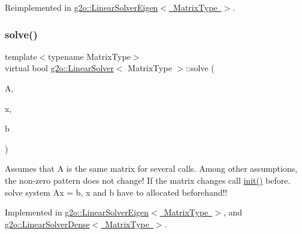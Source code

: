 Reimplemented in \mbox{\hyperlink{classg2o_1_1_linear_solver_eigen_a5ceaab3ba944d327b21f7329c7e19c8c}{g2o\+::\+Linear\+Solver\+Eigen$<$ Matrix\+Type $>$}}.

\mbox{\label{classg2o_1_1_linear_solver_aa44b40826d50203c8ce2ff258c34e030}} 
\subsubsection{\texorpdfstring{solve()}{solve()}}
{\footnotesize\ttfamily template$<$typename Matrix\+Type$>$ \\
virtual bool \mbox{\hyperlink{classg2o_1_1_linear_solver}{g2o\+::\+Linear\+Solver}}$<$ Matrix\+Type $>$\+::solve (\begin{DoxyParamCaption}\item[{const \mbox{\hyperlink{classg2o_1_1_sparse_block_matrix}{Sparse\+Block\+Matrix}}$<$ Matrix\+Type $>$ \&}]{A,  }\item[{double $\ast$}]{x,  }\item[{double $\ast$}]{b }\end{DoxyParamCaption})\hspace{0.3cm}{\ttfamily [pure virtual]}}

Assumes that A is the same matrix for several calls. Among other assumptions, the non-\/zero pattern does not change! If the matrix changes call \mbox{\hyperlink{classg2o_1_1_linear_solver_aebd961a94ef6de1bc66d2ca41dd2b17b}{init()}} before. solve system Ax = b, x and b have to allocated beforehand!! 

Implemented in \mbox{\hyperlink{classg2o_1_1_linear_solver_eigen_ae4ac566af324a238a31145c1e50b52e1}{g2o\+::\+Linear\+Solver\+Eigen$<$ Matrix\+Type $>$}}, and \mbox{\hyperlink{classg2o_1_1_linear_solver_dense_a8b6eafa6e53b9f705a4e8eb436eeb403}{g2o\+::\+Linear\+Solver\+Dense$<$ Matrix\+Type $>$}}.

\mbox{\label{classg2o_1_1_linear_solver_a252e3658b3ba0c3577c33f846c514535}} 
